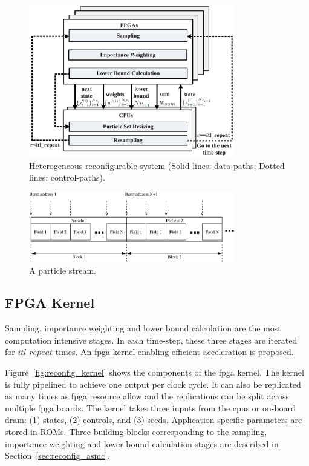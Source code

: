 \begin{figure}[t!]
\centering
\includegraphics[width=0.8\textwidth]{4_adaptation/figures/fig_arch}
\caption[Heterogeneous reconfigurable system]{Heterogeneous reconfigurable system (Solid lines: data-paths; Dotted lines: control-paths).}
\label{fig:reconfig_arch}
\end{figure}

\begin{figure}[t!]
\centering
\includegraphics[width=0.8\textwidth]{4_adaptation/figures/fig_particles}
\caption{A particle stream.}
\label{fig:particles_stream}
\end{figure}

\subsection{FPGA Kernel}
Sampling, importance weighting and lower bound calculation are the most computation intensive stages.
In each time-step, these three stages are iterated for $itl\_repeat$ times.
An \gls{fpga} kernel enabling efficient acceleration is proposed.

Figure~\ref{fig:reconfig_kernel} shows the components of the \gls{fpga} kernel.
The kernel is fully pipelined to achieve one output per clock cycle.
It can also be replicated as many times as \gls{fpga} resource allow and the replications can be split across multiple \gls{fpga} boards.
The kernel takes three inputs from the \glspl{cpu} or on-board \gls{dram}: (1) states, (2) controls, and (3) seeds.
Application specific parameters are stored in ROMs.
Three building blocks corresponding to the sampling, importance weighting and lower bound calculation stages are described in Section~\ref{sec:reconfig_asmc}.

